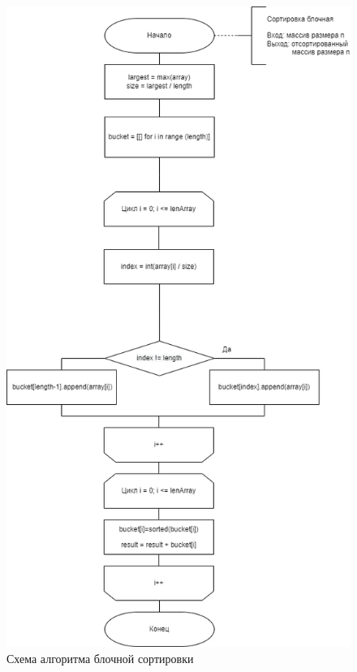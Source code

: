 \begin{figure}[H]
	\begin{center}
		\includegraphics[scale=0.5]{img/bucket_sort.png}
	\end{center}
	\captionsetup{justification=centering}
	\caption{Схема алгоритма блочной сортировки}
	\label{img:bucket_sort}
\end{figure}

